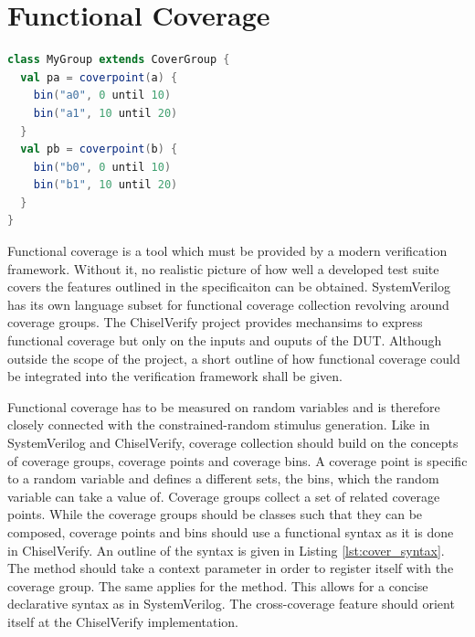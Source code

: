 \section{Functional Coverage} %

\begin{listing}
\begin{lstlisting}[language=scala, captionpos=b, caption=Outline of the syntax for the collection of functional coverage.,label=lst:cover_syntax]
class MyGroup extends CoverGroup {
  val pa = coverpoint(a) {
    bin("a0", 0 until 10)
    bin("a1", 10 until 20)
  }
  val pb = coverpoint(b) {
    bin("b0", 0 until 10)
    bin("b1", 10 until 20)
  }
}
\end{lstlisting}
\end{listing}

Functional coverage is a tool which must be provided by a modern verification framework. Without it, no realistic
picture of how well a developed test suite covers the features outlined in the specificaiton can be obtained.
SystemVerilog has its own language subset for functional coverage collection revolving around coverage groups. The
ChiselVerify project provides mechansims to express functional coverage but only on the inputs and ouputs of the DUT.
Although outside the scope of the project, a short outline of how functional coverage could be integrated into the
verification framework shall be given.

Functional coverage has to be measured on random variables and is therefore closely connected with the
constrained-random stimulus generation. Like in SystemVerilog and ChiselVerify, coverage collection should build on
the concepts of coverage groups, coverage points and coverage bins. A coverage point is specific to a random variable
and defines a different sets, the bins, which the random variable can take a value of. Coverage groups collect a set
of related coverage points. While the coverage groups should be classes such that they can be composed, coverage
points and bins should use a functional syntax as it is done in ChiselVerify. An outline of the syntax is given in
Listing \ref{lst:cover_syntax}. The  method should take a context parameter in order to register
itself with the coverage group. The same applies for the  method. This allows for a concise declarative
syntax as in SystemVerilog. The cross-coverage feature should orient itself at the ChiselVerify implementation.

